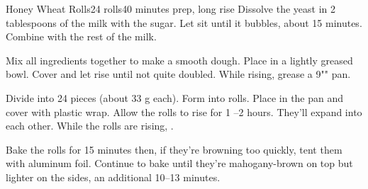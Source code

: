 \documentclass[../Cookbook.tex]{subfiles}
\begin{document}
\begin{recipe}[HoneyWheatRolls]{Honey Wheat Rolls}{24 rolls}{40 minutes prep, long rise}
	Dissolve the yeast in 2 tablespoons of the milk with the sugar. Let sit until it bubbles, about 15 minutes.
	Combine with the rest of the milk.

	Mix all ingredients together to make a smooth dough.
	Place in a lightly greased bowl.
	Cover and let rise until not quite doubled.
	While rising, grease a 9"" pan.

	Divide into 24 pieces (about 33 g each).
	Form into rolls. Place in the pan and cover with plastic wrap. Allow the rolls to rise for 1 --2 hours. They'll expand into each other.
	While the rolls are rising, .

	Bake the rolls for 15 minutes then, if they're browning too quickly, tent them with aluminum foil.
	Continue to bake until they're mahogany-brown on top but lighter on the sides, an additional 10--13 minutes.
\end{recipe}
\end{document}
